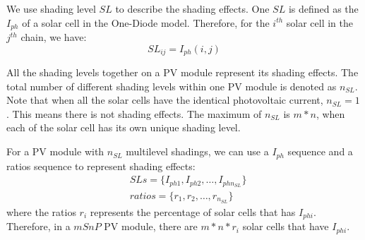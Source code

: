 We use shading level $SL$ to describe the shading effects. One $SL$ is defined as the $I_{ph}$ of a solar cell in the One-Diode model. Therefore, for the $i^{th}$ solar cell in the $j^{th}$ chain, we have:
\begin{equation}\label{equ:shadingLevel}
  SL_{ij} = I_{ph}(i,j)
\end{equation}

All the shading levels together on a PV module represent its shading effects. The total number of different shading levels within one PV module is denoted as $n_{SL}$. Note that when all the solar cells have the identical photovoltaic current, $n_{SL} = 1$. This means there is not shading effects. The maximum of $n_{SL}$ is $m*n$, when each of the solar cell has its own unique shading level.

For a PV module with $n_{SL}$ multilevel shadings, we can use a $I_{ph}$ sequence and a ratios sequence to represent shading effects:
\begin{equation}\label{equ:slRepresent}
\begin{aligned}
  &SLs = \{I_{ph1}, I_{ph2},\dots, I_{phn_{SL}}\}\\
  &ratios = \{r_1, r_2, \dots, r_{n_{SL}}\}
\end{aligned}
\end{equation}
where the ratios $r_i$ represents the percentage of solar cells that has $I_{phi}$. Therefore, in a $mSnP$ PV module, there are $m*n*r_i$ solar cells that have $I_{phi}$.




